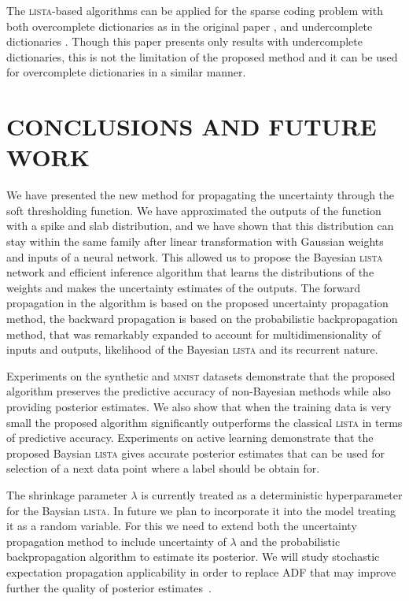 \documentclass[letterpaper]{article}
\begin{document}

The \textsc{lista}-based algorithms can be applied for the sparse coding problem with both overcomplete dictionaries as in the original paper \citep{gregor2010learning}, and undercomplete dictionaries \citep{borgerding2017amp}. Though this paper presents only results with undercomplete dictionaries, this is not the limitation of the proposed method and it can be used for overcomplete dictionaries in a similar manner.

\section{\uppercase{Conclusions and future work}}
\label{sec:conclusions}
We have presented the new method for propagating the uncertainty through the soft thresholding function. %
We have approximated the outputs of the function with a spike and slab distribution, and we have shown that this distribution can stay within the same family after linear transformation with Gaussian weights and inputs of a neural network. This allowed us to propose the Bayesian \textsc{lista} network and efficient inference algorithm that learns the distributions of the weights and makes the uncertainty estimates of the outputs. The forward propagation in the algorithm is based on the proposed uncertainty propagation method, the backward propagation is based on the probabilistic backpropagation method, that was remarkably expanded to account for multidimensionality of inputs and outputs, likelihood of the Bayesian \textsc{lista} and its recurrent nature.

Experiments on the synthetic and \textsc{mnist} datasets demonstrate that the proposed algorithm preserves the predictive accuracy of non-Bayesian methods while also providing posterior estimates. We also show that when the training data is very small the proposed algorithm significantly outperforms the classical \textsc{lista} in terms of predictive accuracy. Experiments on active learning demonstrate that the proposed Baysian \textsc{lista} gives accurate posterior estimates that can be used for selection of a next data point where a label should be obtain for. 

The shrinkage parameter $\lambda$ is currently treated as a deterministic hyperparameter for the Baysian \textsc{lista}. In future we plan to incorporate it into the model treating it as a random variable. For this we need to extend both the uncertainty propagation method to include uncertainty of $\lambda$ and the probabilistic backpropagation algorithm to estimate its posterior. We will study stochastic expectation propagation applicability in order to replace ADF that may improve further the quality of posterior estimates~\citep{li2015stochastic}.    


\end{document}
